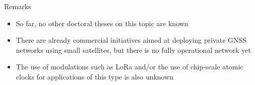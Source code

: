 \begin{frame}{Remarks}

    \begin{itemize}
        \item So far, no other doctoral theses on this topic are known
        \vspace{0.3cm}
        \item There are already commercial initiatives aimed at deploying private GNSS networks using small satellites, but there is no fully operational network yet
        \vspace{0.3cm}
        \item The use of modulations such as LoRa and/or the use of chip-scale atomic clocks for applications of this type is also unknown
    \end{itemize}

\end{frame}
